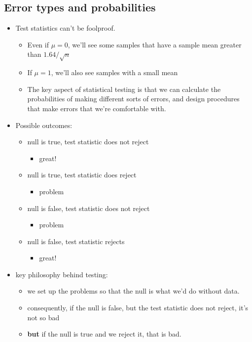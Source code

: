 \subsection{Error types and probabilities}
\label{sec-2-3}

\begin{itemize}
\item Test statistics can't be foolproof.
\begin{itemize}
\item Even if $\mu = 0$, we'll see some samples that have a sample
         mean greater than $1.64 / \sqrt{n}$
\item If $\mu = 1$, we'll also see samples with a small mean
\item The key aspect of statistical testing is that we can calculate
         the probabilities of making different sorts of errors, and
         design procedures that make errors that we're comfortable with.
\end{itemize}
\item Possible outcomes:
\begin{itemize}
\item null is true, test statistic does not reject
\begin{itemize}
\item great!
\end{itemize}
\item null is true, test statistic does reject
\begin{itemize}
\item problem
\end{itemize}
\item null is false, test statistic does not reject
\begin{itemize}
\item problem
\end{itemize}
\item null is false, test statistic rejects
\begin{itemize}
\item great!
\end{itemize}
\end{itemize}
\item key philosophy behind testing:
\begin{itemize}
\item we set up the problems so that the null is what we'd do
         without data.
\item consequently, if the null is false, but the test statistic
         does not reject, it's not so bad
\item \textbf{but} if the null is true and we reject it, that is bad.

\end{itemize}
\end{itemize}
